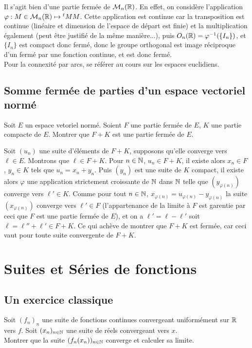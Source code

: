 \begin{sol}
	Il s'agit bien d'une partie fermée de $\mathcal M_n(\mathbb{R})$. En effet, on considère l'application $\varphi : M\in\mathcal M_n(\mathbb{R})\mapsto {}^tMM$. Cette application est continue car la transposition est continue (linéaire et dimension de l'espace de départ est finie) et la multiplication également (peut être justifié de la même manière...), puis $O_n(\mathbb{R})=\varphi^{-1}(\lbrace I_n\rbrace)$, et $\lbrace I_n\rbrace$ est compact donc fermé, donc le groupe orthogonal est image réciproque d'un fermé par une fonction continue, et est donc fermé.\\
	Pour la connexité par arcs, se référer au cours sur les espaces euclidiens.
\end{sol}

\subsection{Somme fermée de parties d'un espace vectoriel normé}
\begin{exo}
	Soit $E$ un espace vetoriel normé. Soient $F$ une partie fermée de $E$, $K$ une partie compacte de $E$. Montrer que $F + K$ est une partie fermée de $E$.
\end{exo}

\begin{sol}
	Soit $(u_n)$ une suite d'éléments de $F + K$, supposons qu'elle converge vers $\ell \in E$. Montrons que $\ell \in F + K$. Pour $n\in\mathbb{N}$, $u_n\in F + K$, il existe alors $x_n\in F$, $y_n\in K$ tels que $u_n=x_n + y_n$. Puis $(y_n)$ est une suite de $K$ compact, il existe alors $\varphi$ une application strictement croissante de $\mathbb{N}$ dans $\mathbb{N}$ telle que $(y_{\varphi(n)})$ converge vers $\ell'\in K$. Comme pour tout $n\in \mathbb{N}$, $x_{\varphi(n)}=u_{\varphi(n)}-y_{\varphi(n)}$ la suite $(x_{\varphi(n)})$ converge vers $\ell'\in F$ (l'appartenance de la limite à $F$ est garentie par ceci que $F$ est une partie fermée de $E$), et on a $\ell' = \ell - \ell'$ soit $\ell=\ell''+\ell'\in F + K$. Ce qui achève de montrer que $F + K$ est fermée, car ceci vaut pour toute suite convergente de $F + K$.
\end{sol}

%
%

\newpage
\section[Suites et Séries de fonctions]{Suites et Séries de fonctions}
\subsection{Un exercice classique}
\begin{exo}
	Soit $(f_n)_n$ une suite de fonctions continues convergeant uniformément sur $\mathbb{R}$ vers $f$. Soit $(x_n)_{n\in\mathbb{N}}$ une suite de réels convergeant vers $x$.\\
	Montrer que la suite $(f_n(x_n))_{n\in\mathbb{N}}$ converge et calculer sa limite.
\end{exo}

